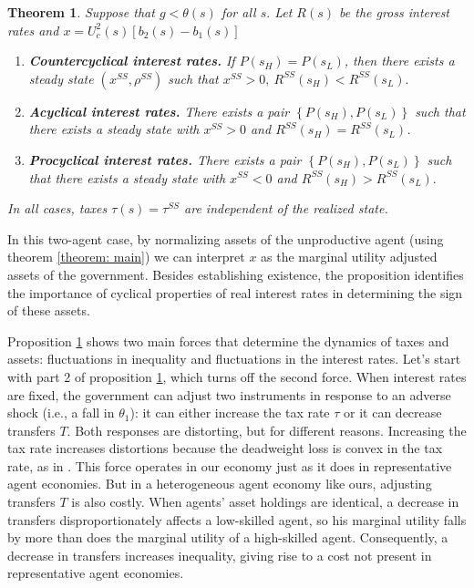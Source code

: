 \documentclass[11.5pt,twoside]{article}
\newtheorem{theorem}{Theorem}
\begin{document}
\begin{theorem}
\label{thm long run forces}\smallskip Suppose that $g<\theta (s)$ for all $%
s.$ Let $R(s)$ be the gross interest rates and $x=U^2_c(s)\left[b_2(s)-b_1(s)\right]$

\begin{enumerate}
\item \textbf{Countercyclical interest rates.} If $P \left( s_{H}\right) =P\left( s_{L}\right)$, then
there exists a steady state $\left( x^{SS},\rho ^{SS}\right) $ such that $%
x^{SS}>0,\ R^{SS}\left( s_{H}\right) <R^{SS}\left( s_{L}\right) .$
\item \textbf{Acyclical interest rates.}  There exists a pair $\left\{ P\left( s_{H}\right) ,P \left( s_{L}\right)
\right\} $ such that there exists a steady state with $x^{SS}>0$ and $R^{SS}\left(
s_{H}\right) =R^{SS}\left( s_{L}\right)$.
\item \textbf{Procyclical interest rates.} There exists a pair  $\left\{ P \left( s_{H}\right) ,P\left( s_{L}\right)
\right\} $ such that there exists a steady state with $x^{SS}<0$ and  $R^{SS}\left( s_{H}\right) >R^{SS}\left( s_{L}\right) .$
\end{enumerate}
In all cases, taxes $\tau(s)=\tau^{SS}$ are independent of the realized state.
\end{theorem}


In this two-agent case, by normalizing assets of the unproductive agent (using theorem \ref{theorem: main}) we can interpret $x$ as the marginal utility adjusted assets of the government. Besides establishing existence, the proposition identifies the importance of cyclical properties of real interest rates in determining the sign of these assets.

Proposition \ref{thm long run forces}  shows  two main forces that determine the dynamics of taxes
and assets: fluctuations in inequality and fluctuations in the interest rates. Let's start with part 2 of proposition \ref{thm long run forces}, which turns off the second force. When  interest rates are fixed, the government can adjust two
instruments in response  to an adverse  shock (i.e., a fall in $\theta_1$): it can either increase the  tax rate $%
\tau $ or it can decrease transfers $T.$ Both  responses are distorting,
but for different reasons. Increasing the tax rate increases distortions because the deadweight loss is convex in the tax rate,
 as in \cite{Barro1979}. This force operates in our economy just as it does in  representative agent economies.
 But in a  heterogeneous agent economy like ours,  adjusting transfers $T$ is
also costly. When agents' asset holdings are identical, a decrease in transfers  disproportionately
affects a low-skilled agent, so his marginal utility
falls by more than does the marginal utility of a high-skilled agent. Consequently, a
decrease in transfers increases inequality, giving rise to a cost  not present in  representative agent economies.
\end{document}
